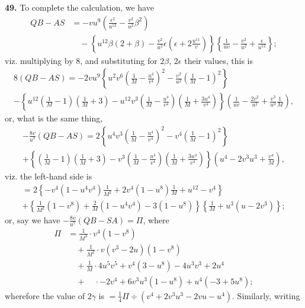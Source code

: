 \documentclass[12pt,a4paper]{article}
\begin{document}
\textbf{49.} To complete the calculation, we have
\begin{align*}
QB - AS &= -vu^9\left(\frac{\epsilon^2}{u^{12}} - \frac{v^2}{u^2}\beta^2\right) \\
&\quad - \left\{u^{12}\beta(2 + \beta) - \frac{v^2}{u^2}\epsilon\left(\epsilon + 2\frac{u^{11}}{v}\right)\right\}
\left\{\frac{1}{uv} - \frac{v^2}{u^2} + \frac{\epsilon}{u^{12}}\right\};
\end{align*}
viz. multiplying by 8, and substituting for $2\beta$, $2\epsilon$ their values, this is
\begin{multline*}
8(QB - AS) = -2vu^9\left\{u^2 v^6\left(\frac{1}{M} - \frac{u^4}{v^4}\right)^2 - \frac{v^2}{u^2}\left(\frac{1}{M} - 1\right)^2\right\} \\
- \left\{u^{12}\left(\frac{1}{M} - 1\right)\left(\frac{1}{M} + 3\right)
- u^{12} v^3\left(\frac{1}{M} - \frac{u^4}{v^4}\right)\left(\frac{1}{M} + \frac{3u^4}{v^4}\right)\right\}
\left(\frac{1}{uv} - \frac{2v^2}{u^2} + \frac{v^3}{u^3}\frac{1}{M}\right),
\end{multline*}
or, what is the same thing,
\begin{multline*}
-\frac{8v}{u^7}(QB - AS) = 2\left\{u^4 v^3\left(\frac{1}{M} - \frac{u^4}{v^4}\right)^2 - v^4\left(\frac{1}{M} - 1\right)^2\right\} \\
+ \left\{\left(\frac{1}{M} - 1\right)\left(\frac{1}{M} + 3\right)
- v^3\left(\frac{1}{M} - \frac{u^4}{v^4}\right)\left(\frac{1}{M} + \frac{3u^4}{v^4}\right)\right\}
\left(u^4 - 2v^3 u^3 + \frac{v^4}{M}\right),
\end{multline*}
viz. the left-hand side is
\begin{multline*}
= 2\left\{-v^4(1 - u^4 v^4)\frac{1}{M^2} + 2v^4(1 - u^8)\frac{1}{M} + u^{12} - v^4\right\} \\
+ \left\{\frac{1}{M^2}(1 - v^8) + \frac{2}{M}(1 - u^4 v^4) - 3(1 - u^8)\right\}
\left\{\frac{1}{M} + u^3(u - 2v^3)\right\};
\end{multline*}
or, say we have $-\frac{8v}{u^7}(QB - SA) = \Pi$, where
\begin{align*}
\Pi &= \frac{1}{M^3} \cdot v^4(1 - v^8) \\
&\quad + \frac{1}{M^2} \cdot v(v^3 - 2u)(1 - v^8) \\
&\quad + \frac{1}{M} \cdot 4u^5 v^5 + v^4(3 - u^8) - 4u^3 v^3 + 2u^4 \\
&\quad + \quad \cdot -2v^4 + 6v^3 u^3(1 - u^8) + u^4(-3 + 5u^8);
\end{align*}
wherefore the value of $2\gamma$ is $= \frac{1}{4}\Pi \div (v^4 + 2v^3 u^3 - 2vu - u^4)$. Similarly, writing
\end{document}
